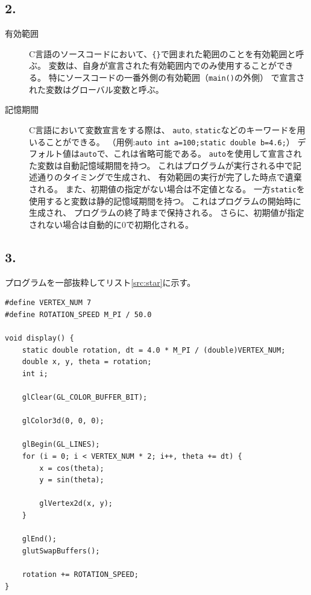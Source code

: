 \documentclass{jsarticle}
\begin{document}
    \subsection*{2.}
        \begin{description}
            \item[有効範囲]{
                C言語のソースコードにおいて、\verb|{}|で囲まれた範囲のことを有効範囲と呼ぶ。
                変数は、自身が宣言された有効範囲内でのみ使用することができる。
                特にソースコードの一番外側の有効範囲（\verb|main()|の外側）
                で宣言された変数はグローバル変数と呼ぶ。
            }
            \item[記憶期間]{
                C言語において変数宣言をする際は、
                \verb|auto|, \verb|static|などのキーワードを用いることができる。
                （用例:\verb|auto int a=100;static double b=4.6;|）
                デフォルト値は\verb|auto|で、これは省略可能である。
                \verb|auto|を使用して宣言された変数は自動記憶域期間を持つ。
                これはプログラムが実行される中で記述通りのタイミングで生成され、
                有効範囲の実行が完了した時点で遺棄される。
                また、初期値の指定がない場合は不定値となる。
                一方\verb|static|を使用すると変数は静的記憶域期間を持つ。
                これはプログラムの開始時に生成され、
                プログラムの終了時まで保持される。
                さらに、初期値が指定されない場合は自動的に0で初期化される。
            }
        \end{description}

    \subsection*{3.}
        プログラムを一部抜粋してリスト\ref{src:star}に示す。

        \begin{lstlisting}[caption=星型正多角形を描くプログラム, label=src:star]
#define VERTEX_NUM 7
#define ROTATION_SPEED M_PI / 50.0

void display() {
    static double rotation, dt = 4.0 * M_PI / (double)VERTEX_NUM;
    double x, y, theta = rotation;
    int i;
    
    glClear(GL_COLOR_BUFFER_BIT);

    glColor3d(0, 0, 0);

    glBegin(GL_LINES);
    for (i = 0; i < VERTEX_NUM * 2; i++, theta += dt) {
        x = cos(theta);
        y = sin(theta);

        glVertex2d(x, y);
    }

    glEnd();
    glutSwapBuffers();

    rotation += ROTATION_SPEED;
}\end{lstlisting}
\end{document}
